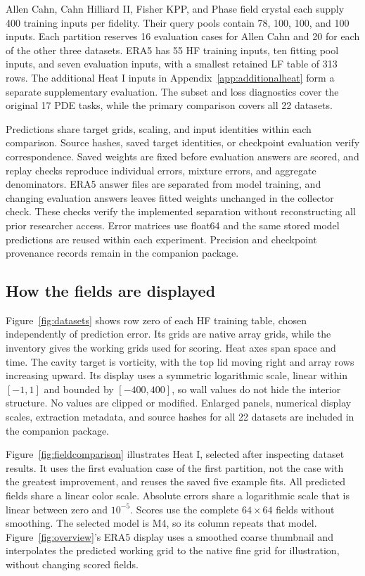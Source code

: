 Allen Cahn, Cahn Hilliard II, Fisher KPP, and Phase field crystal each supply
400 training inputs per fidelity. Their query pools contain 78, 100, 100, and
100 inputs. Each partition reserves 16 evaluation cases for Allen Cahn and
20 for each of the other three datasets. ERA5 has 55 HF training inputs,
ten fitting pool inputs, and seven evaluation inputs, with a smallest retained
LF table of 313 rows. The additional Heat I inputs in
Appendix~\ref{app:additionalheat} form a separate supplementary evaluation.
The subset and loss diagnostics cover the original 17 PDE tasks, while the
primary comparison covers all 22 datasets.

Predictions share target grids, scaling, and input identities within each
comparison. Source hashes, saved target identities, or checkpoint evaluation
verify correspondence. Saved weights are fixed before evaluation answers are
scored, and replay checks reproduce individual errors, mixture errors, and
aggregate denominators. ERA5 answer files are separated from model training,
and changing evaluation answers leaves fitted weights unchanged in the
collector check. These checks verify the implemented separation without
reconstructing all prior researcher access. Error matrices use float64 and
the same stored model predictions are reused within each experiment.
Precision and checkpoint provenance records remain in the companion package.

\subsection{How the fields are displayed}
\label{app:gallery}
Figure~\ref{fig:datasets} shows row zero of each HF training table, chosen
independently of prediction error. Its grids are native array grids, while
the inventory gives the working grids used for scoring. Heat axes span space
and time. The cavity target is vorticity, with the top lid moving right and
array rows increasing upward. Its display uses a symmetric logarithmic scale,
linear within $[-1,1]$ and bounded by $[-400,400]$, so wall values do not hide
the interior structure. No values are clipped or modified. Enlarged panels,
numerical display scales, extraction metadata, and source hashes for all
22 datasets are included in the companion package.

Figure~\ref{fig:fieldcomparison} illustrates Heat I, selected after inspecting
dataset results. It uses the first evaluation case of the first partition,
not the case with the greatest improvement, and reuses the saved five example
fits. All predicted fields share a linear color scale. Absolute errors share
a logarithmic scale that is linear between zero and $10^{-5}$. Scores use
the complete $64\times64$ fields without smoothing. The selected model is M4,
so its column repeats that model. Figure~\ref{fig:overview}'s ERA5 display
uses a smoothed coarse thumbnail and interpolates the predicted working grid
to the native fine grid for illustration, without changing scored fields.
